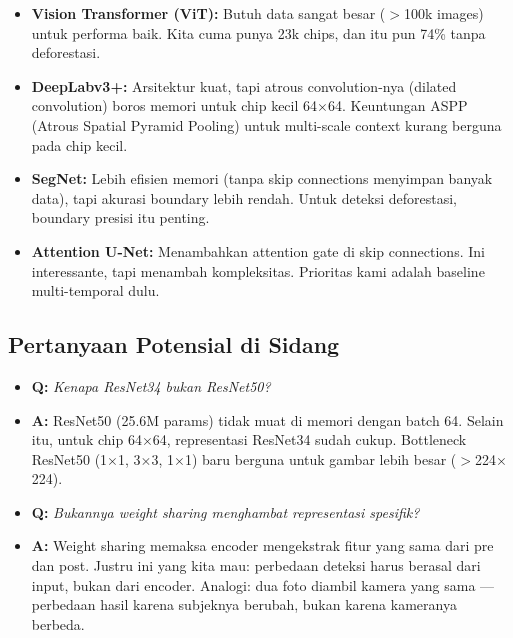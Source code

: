 \documentclass[10pt,a4paper,onecolumn]{article}
\begin{document}
\begin{itemize}
    \item{\textbf{Vision Transformer (ViT):} Butuh data sangat besar
          ($>$100k images) untuk performa baik. Kita cuma punya 23k
          chips, dan itu pun 74\% tanpa deforestasi.}
    \item{\textbf{DeepLabv3+:} Arsitektur kuat, tapi atrous
          convolution-nya (dilated convolution) boros memori untuk
          chip kecil 64$\times$64. Keuntungan ASPP (Atrous Spatial
          Pyramid Pooling) untuk multi-scale context kurang berguna
          pada chip kecil.}
    \item{\textbf{SegNet:} Lebih efisien memori (tanpa skip
          connections menyimpan banyak data), tapi akurasi boundary
          lebih rendah. Untuk deteksi deforestasi, boundary presisi
          itu penting.}
    \item{\textbf{Attention U-Net:} Menambahkan attention gate di
          skip connections. Ini interessante, tapi menambah
          kompleksitas. Prioritas kami adalah baseline multi-temporal
          dulu.}
\end{itemize}

\subsection{Pertanyaan Potensial di Sidang}

\begin{itemize}
    \item{\textbf{Q:} \textit{Kenapa ResNet34 bukan ResNet50?}}
    \item{\textbf{A:} ResNet50 (25.6M params) tidak muat di memori
          dengan batch 64. Selain itu, untuk chip 64$\times$64,
          representasi ResNet34 sudah cukup. Bottleneck ResNet50
          (1$\times$1, 3$\times$3, 1$\times$1) baru berguna untuk
          gambar lebih besar ($>$224$\times$224).}
\end{itemize}

\begin{itemize}
    \item{\textbf{Q:} \textit{Bukannya weight sharing menghambat
          representasi spesifik?}}
    \item{\textbf{A:} Weight sharing memaksa encoder mengekstrak
          fitur yang sama dari pre dan post. Justru ini yang kita
          mau: perbedaan deteksi harus berasal dari input, bukan dari
          encoder. Analogi: dua foto diambil kamera yang sama —
          perbedaan hasil karena subjeknya berubah, bukan karena
          kameranya berbeda.}
\end{itemize}
\end{document}
